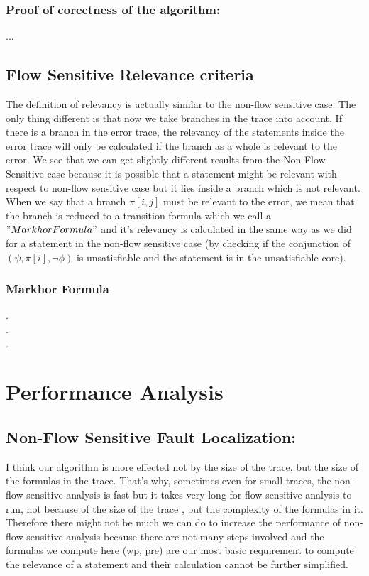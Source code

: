 \documentclass{article}
\begin{document}
\subsubsection{Proof of corectness of the algorithm:}
...
\subsection{Flow Sensitive Relevance criteria }
The definition of relevancy is actually similar to the non-flow sensitive case. The only thing different is that now we take branches in the trace into account. If there is a branch in the error trace, the relevancy of the statements inside the error trace will only be calculated if the branch as a whole is relevant to the error. We see that we can get slightly different results from the Non-Flow Sensitive case because it is possible that a statement might be relevant with respect to non-flow sensitive case but it lies inside a branch which is not relevant. \\
When we say that a branch $\pi[i,j]$ must be relevant to the error, we mean that the branch is reduced to a transition formula which we call a $"Markhor Formula"$ and it's relevancy is calculated in the same way as we did for a statement in the non-flow sensitive case (by checking if the conjunction of $(\psi, \pi[i],\neg \phi)$ is unsatisfiable and the statement is in the unsatisfiable core).
\subsubsection{Markhor Formula}
.\\
.\\
.

\section{Performance Analysis}
\subsection{Non-Flow Sensitive Fault Localization:}
I think our algorithm is more effected not by the size of the trace, but the size of the formulas in the trace. That's why, sometimes even for small traces, the non-flow sensitive analysis is fast but it takes very long for flow-sensitive analysis to run, not because  of the size of the trace , but the complexity of the formulas in it. \\
Therefore there might not be much we can do to increase the performance of non-flow sensitive analysis because there are not many steps involved and the formulas we compute here (wp, pre) are our most basic requirement to compute the relevance of a statement and their calculation cannot be further simplified.
\end{document}
